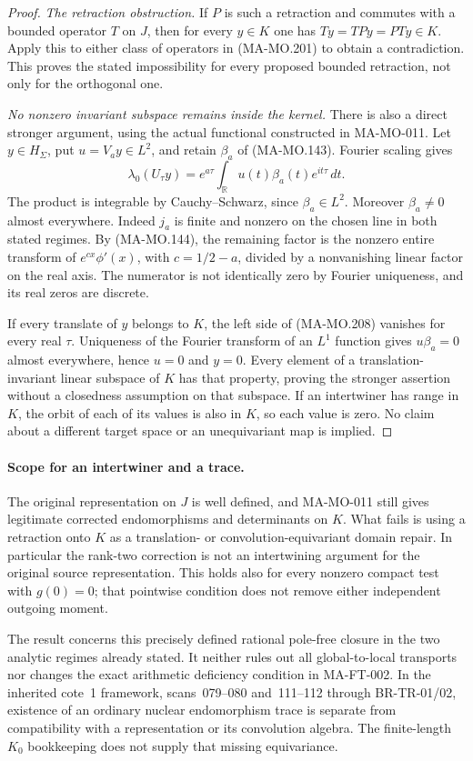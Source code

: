 \begin{proof}
\emph{The retraction obstruction.}
If \(P\) is such a retraction and commutes with a
bounded operator \(T\) on \(J\), then for every
\(y\in K\) one has \(Ty=TPy=PTy\in K\).
Apply this to either class of operators in (MA-MO.201)
to obtain a contradiction. This proves the stated
impossibility for every proposed bounded retraction,
not only for the orthogonal one.

\emph{No nonzero invariant subspace remains inside the kernel.}
There is also a direct stronger argument, using the actual
functional constructed in MA-MO-011. Let \(y\in H_\Sigma\),
put \(u=V_ay\in L^2\), and retain \(\beta_a\) of
(MA-MO.143). Fourier scaling gives
\[
 \lambda_0(U_\tau y)
   =e^{a\tau}\int_{\mathbb R}u(t)\beta_a(t)e^{it\tau}\,dt.
 \tag{MA-MO.208}
\]
The product is integrable by Cauchy--Schwarz, since
\(\beta_a\in L^2\). Moreover \(\beta_a\ne0\) almost
everywhere. Indeed \(j_a\) is finite and nonzero on the
chosen line in both stated regimes. By (MA-MO.144), the
remaining factor is the nonzero entire transform of
\(e^{cx}\phi'(x)\), with \(c=1/2-a\), divided by a nonvanishing linear
factor on the real axis. The numerator is not identically
zero by Fourier uniqueness, and its real zeros are discrete.

If every translate of \(y\) belongs to \(K\), the left
side of (MA-MO.208) vanishes for every real \(\tau\).
Uniqueness of the Fourier transform of an \(L^1\) function
gives \(u\beta_a=0\) almost everywhere, hence \(u=0\)
and \(y=0\). Every element of a translation-invariant
linear subspace of \(K\) has that property, proving the
stronger assertion without a closedness assumption on
that subspace. If an intertwiner has range in \(K\),
the orbit of each of its values is also in \(K\), so
each value is zero. No claim about a different target
space or an unequivariant map is implied.
\end{proof}

\paragraph{Scope for an intertwiner and a trace.}
The original representation on \(J\) is well defined,
and MA-MO-011 still gives legitimate corrected endomorphisms
and determinants on \(K\). What fails is using a retraction
onto \(K\) as a translation- or convolution-equivariant
domain repair. In particular the rank-two correction is
not an intertwining argument for the original source
representation. This holds also for every nonzero compact
test with \(g(0)=0\); that pointwise condition does not
remove either independent outgoing moment.

The result concerns this precisely defined rational
pole-free closure in the two analytic regimes already
stated. It neither rules out all global-to-local transports
nor changes the exact arithmetic deficiency condition in
MA-FT-002. In the inherited cote~1 framework, scans~079--080
and~111--112 through BR-TR-01/02, existence of an ordinary
nuclear endomorphism trace is separate from compatibility
with a representation or its convolution algebra. The
finite-length \(K_0\) bookkeeping does not supply that
missing equivariance.
